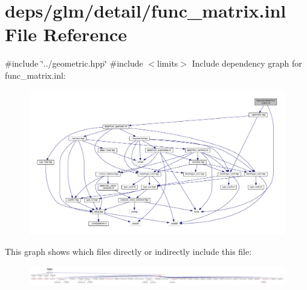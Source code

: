 \hypertarget{func__matrix_8inl}{}\section{deps/glm/detail/func\+\_\+matrix.inl File Reference}
\label{func__matrix_8inl}
{\ttfamily \#include \char`\"{}../geometric.\+hpp\char`\"{}}\newline
{\ttfamily \#include $<$limits$>$}\newline
Include dependency graph for func\+\_\+matrix.\+inl\+:
\nopagebreak
\begin{figure}[H]
\begin{center}
\leavevmode
\includegraphics[width=350pt]{df/dc0/func__matrix_8inl__incl}
\end{center}
\end{figure}
This graph shows which files directly or indirectly include this file\+:
\nopagebreak
\begin{figure}[H]
\begin{center}
\leavevmode
\includegraphics[width=350pt]{de/d5a/func__matrix_8inl__dep__incl}
\end{center}
\end{figure}
